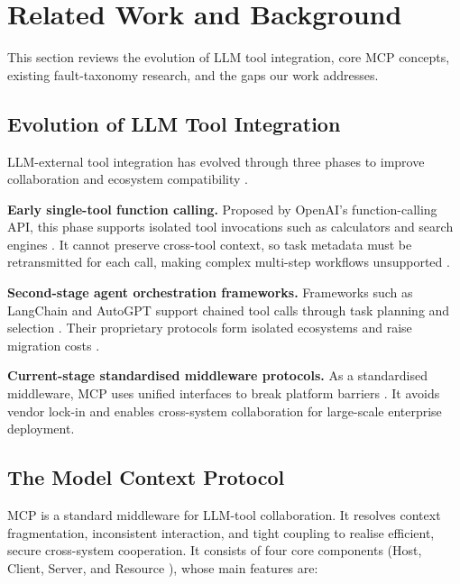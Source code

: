 
\section{Related Work and Background}\label{sec:related}

This section reviews the evolution of LLM tool integration, core MCP concepts, existing
fault-taxonomy research, and the gaps our work addresses.

\subsection{Evolution of LLM Tool Integration}

LLM-external tool integration has evolved through three phases to improve collaboration and
ecosystem compatibility \cite{liu2024toolace}.

\textbf{Early single-tool function calling.} Proposed by OpenAI's function-calling API, this
phase supports isolated tool invocations such as calculators and search engines
\cite{zhang2024large}. It cannot preserve cross-tool context, so task metadata must be
retransmitted for each call, making complex multi-step workflows unsupported
\cite{kim2024llm}\cite{wang2025function}.

\textbf{Second-stage agent orchestration frameworks.} Frameworks such as LangChain and
AutoGPT support chained tool calls through task planning and selection \cite{lin2025mao}.
Their proprietary protocols form isolated ecosystems and raise migration costs
\cite{haddad2017connecting}.

\textbf{Current-stage standardised middleware protocols.} As a standardised middleware, MCP
uses unified interfaces to break platform barriers \cite{anthropic_mcp_2024}\cite{hou2025model}.
It avoids vendor lock-in and enables cross-system collaboration for large-scale enterprise
deployment.

\subsection{The Model Context Protocol}

MCP is a standard middleware for LLM-tool collaboration. It resolves context fragmentation,
inconsistent interaction, and tight coupling to realise efficient, secure cross-system
cooperation. It consists of four core components (Host, Client, Server, and Resource
\cite{yang2025survey}), whose main features are:

